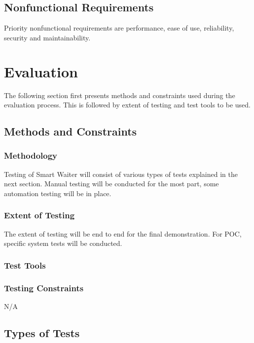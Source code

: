 \documentclass[12pt]{article}
\begin{document}
\subsection{Nonfunctional Requirements}
Priority nonfunctional requirements are performance, ease of use, reliability, security and maintainability.


%
%

\section{Evaluation}

The following section first presents methods and constraints used during the evaluation process. This is followed by extent of testing and test tools to be used.

\subsection{ Methods and Constraints} 

\subsubsection{Methodology} 
Testing of Smart Waiter will consist of various types of tests explained in the next section. Manual testing will be conducted for the most part, some automation testing will be in place.

\subsubsection{Extent of Testing}
The extent of testing will be end to end for the final demonstration. For POC, specific system tests will be conducted.

\subsubsection{Test Tools}

\subsubsection{ Testing Constraints}
N/A

\subsection{Types of Tests}
\end{document}
